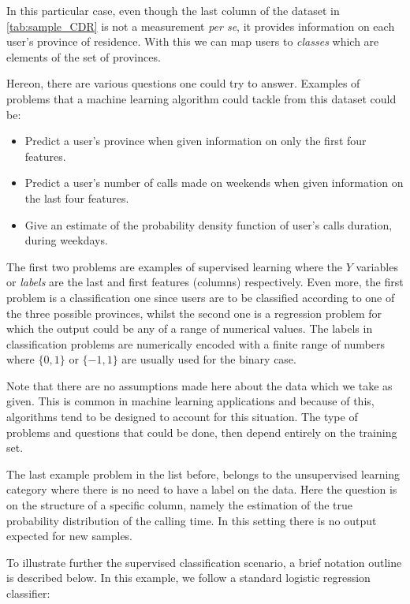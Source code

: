 In this particular case, even though the last column of the dataset in \ref{tab:sample_CDR} is not a measurement \textit{per se}, it provides information on each user's province of residence. With this we can map users to \textit{classes} which are elements of the set of provinces.

Hereon, there are various questions one could try to answer. Examples of problems that a machine learning algorithm could tackle from this dataset could be:

\begin{itemize}
\item Predict a user's province when given information on only the first four features.
\item Predict a user's number of calls made on weekends when given information on the last four features.
\item Give an estimate of the probability density function of user's calls duration, during weekdays.
\end{itemize}

The first two problems are examples of supervised learning where the $Y$ variables or \textit{labels} are the last and first features (columns) respectively. Even more, the first problem is a classification one since users are to be classified according to one of the three possible provinces, whilst the second one is a regression problem for which the output could be any of a range of numerical values. The labels in classification problems are numerically encoded with a finite range of numbers where $\{0,1\}$ or $\{-1,1\}$ are usually used for the binary case.

Note that there are no assumptions made here about the data which we take as given. %
This is common in machine learning applications and because of this, algorithms tend to be designed to account for this situation. The type of problems and questions that could be done, then depend entirely on the training set.

The last example problem in the list before, belongs to the unsupervised learning category where there is no need to have a label on the data. Here the question is on the structure of a specific column, namely the estimation of the true probability distribution of the calling time. In this setting there is no output expected for new samples.

To illustrate further the supervised classification scenario, a brief notation outline is described below. In this example, we follow a standard logistic regression classifier:


